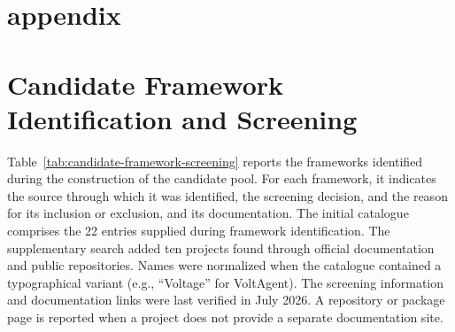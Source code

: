 \section*{appendix}


\section{Candidate Framework Identification and Screening}
\label{appendix:candidate-frameworks}

Table~\ref{tab:candidate-framework-screening} reports the frameworks identified
during the construction of the candidate pool. For each framework, it indicates
the source through which it was identified, the screening decision, and the
reason for its inclusion or exclusion, and its documentation. The initial
catalogue comprises the 22 entries supplied during framework identification.
The supplementary search added ten projects found through official
documentation and public repositories. Names were normalized when the
catalogue contained a typographical variant (e.g., ``Voltage'' for VoltAgent).
The screening information and documentation links were last verified in July
2026. A repository or package page is reported when a project does not provide
a separate documentation site.

